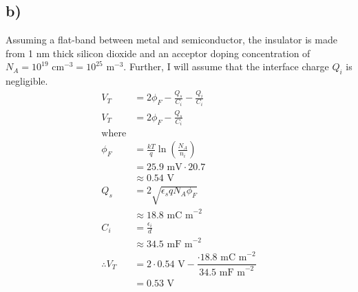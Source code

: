 \subsection*{b)}
Assuming a flat-band between metal and semiconductor, the insulator is made from 1 nm thick silicon dioxide and an acceptor doping concentration of 
$N_A = 10^{19} \textrm{ cm}^{-3} = 10^{25} \textrm{ m}^{-3}$. Further, I will assume that the interface charge $Q_i$ is negligible.
\[
\begin{aligned}
	V_T &= 2 \phi_F - \frac{Q_s}{C_i} - \frac{Q_i}{C_i} \\
	V_T &= 2 \phi_F - \frac{Q_s}{C_i} \\
	\textrm{where}\\
	\phi_F	&= \frac{k T}{q} \ln \left(\frac{N_A}{n_i}\right) \\
		&= 25.9 \textrm{ mV} \cdot 20.7 \\
		&\approx 0.54 \textrm{ V} \\
	Q_s &= 2\sqrt{\epsilon_s q N_A \phi_F} \\
		&\approx 18.8 \textrm{ mC m}^{-2}\\
	C_i &= \frac{\epsilon_i}{d} \\
		&\approx 34.5 \textrm{ mF m}^{-2} \\
		\therefore V_T &= 2 \cdot 0.54 \textrm{ V} -
		 \dfrac{\cdot 18.8  \textrm{ mC m}^{-2}}{34.5 \textrm{ mF m}^{-2}} \\
		 &= 0.53 \textrm{ V}
\end{aligned}
\]